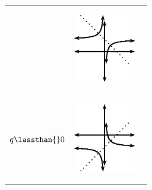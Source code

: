 \begin{center}
\begin{xtabular*}{\mytablewidth}[t]{|p{10\mystarwidth}|p{10\mystarwidth}|p{10\mystarwidth}|}
\begin{center}
\vspace{2pt}
\vspace{.1in}
\end{center}    
    &
\setcounter{subfigure}{0}
\label{m39341*id246943}
\begin{center}
\label{m39341*id246943!!!underscore!!!media}\label{m39341*id246943!!!underscore!!!printimage}\includegraphics[width=100px]{col11306.imgs/m39341_MG10C11_023.png} %
\vspace{2pt}
\vspace{.1in}
\end{center}    
\tabularnewline{}
    $q\lessthan{}0$
    &
\setcounter{subfigure}{0}
\label{m39341*id246981}
\begin{center}
\label{m39341*id246981!!!underscore!!!media}\label{m39341*id246981!!!underscore!!!printimage}\includegraphics[width=100px]{col11306.imgs/m39341_MG10C11_024.png} %
\vspace{2pt}
\vspace{.1in}
\end{center}    
    &
\setcounter{subfigure}{0}
\label{m39341*id246993}

\end{xtabular*}
\end{center}

